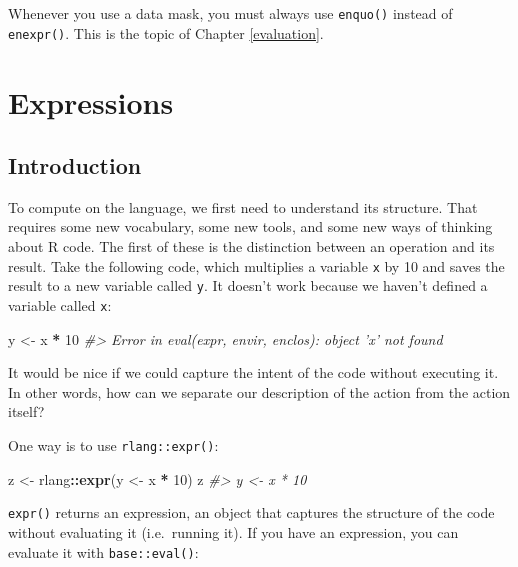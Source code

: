 \documentclass[]{book}
\newenvironment{Shaded}{\begin{snugshade}}{\end{snugshade}}
\newcommand{\CommentTok}[1]{\textcolor[rgb]{0.37,0.37,0.37}{\textit{#1}}}
\newcommand{\DecValTok}[1]{\textcolor[rgb]{0.06,0.06,0.06}{#1}}
\newcommand{\KeywordTok}[1]{\textcolor[rgb]{0.27,0.27,0.27}{\textbf{#1}}}
\newcommand{\NormalTok}[1]{#1}
\newcommand{\OperatorTok}[1]{\textcolor[rgb]{0.43,0.43,0.43}{\textbf{#1}}}
\newcommand{\StringTok}[1]{\textcolor[rgb]{0.5,0.5,0.5}{#1}}
\begin{document}
Whenever you use a data mask, you must always use \texttt{enquo()} instead of \texttt{enexpr()}. This is the topic of Chapter \ref{evaluation}.

\hypertarget{expressions}{%
\chapter{Expressions}\label{expressions}}

\hypertarget{introduction-1}{%
\section{Introduction}\label{introduction-1}}


To compute on the language, we first need to understand its structure. That requires some new vocabulary, some new tools, and some new ways of thinking about R code. The first of these is the distinction between an operation and its result. Take the following code, which multiplies a variable \texttt{x} by 10 and saves the result to a new variable called \texttt{y}. It doesn't work because we haven't defined a variable called \texttt{x}:

\begin{Shaded}
\begin{Highlighting}[]
\NormalTok{y <-}\StringTok{ }\NormalTok{x }\OperatorTok{*}\StringTok{ }\DecValTok{10}
\CommentTok{#> Error in eval(expr, envir, enclos): object 'x' not found}
\end{Highlighting}
\end{Shaded}

It would be nice if we could capture the intent of the code without executing it. In other words, how can we separate our description of the action from the action itself?

One way is to use \texttt{rlang::expr()}:

\begin{Shaded}
\begin{Highlighting}[]
\NormalTok{z <-}\StringTok{ }\NormalTok{rlang}\OperatorTok{::}\KeywordTok{expr}\NormalTok{(y <-}\StringTok{ }\NormalTok{x }\OperatorTok{*}\StringTok{ }\DecValTok{10}\NormalTok{)}
\NormalTok{z}
\CommentTok{#> y <- x * 10}
\end{Highlighting}
\end{Shaded}

\texttt{expr()} returns an expression, an object that captures the structure of the code without evaluating it (i.e.~running it). If you have an expression, you can evaluate it with \texttt{base::eval()}:
\end{document}
